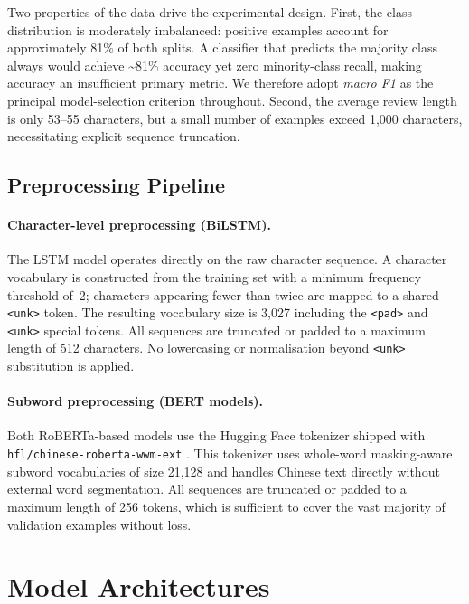 \documentclass{article}
\begin{document}
Two properties of the data drive the experimental design.  First, the class
distribution is moderately imbalanced: positive examples account for
approximately 81\% of both splits.  A classifier that predicts the majority
class always would achieve \textasciitilde81\% accuracy yet zero minority-class
recall, making accuracy an insufficient primary metric.  We therefore adopt
\emph{macro F1} as the principal model-selection criterion throughout.  Second,
the average review length is only 53--55 characters, but a small number of
examples exceed 1{,}000 characters, necessitating explicit sequence truncation.

\subsection{Preprocessing Pipeline}

\paragraph{Character-level preprocessing (BiLSTM).}
The LSTM model operates directly on the raw character sequence.  A character
vocabulary is constructed from the training set with a minimum frequency
threshold of~2; characters appearing fewer than twice are mapped to a shared
\texttt{<unk>} token.  The resulting vocabulary size is 3{,}027 including the
\texttt{<pad>} and \texttt{<unk>} special tokens.  All sequences are truncated
or padded to a maximum length of 512 characters.  No lowercasing or
normalisation beyond \texttt{<unk>} substitution is applied.

\paragraph{Subword preprocessing (BERT models).}
Both RoBERTa-based models use the Hugging Face tokenizer shipped with
\texttt{hfl/chinese-roberta-wwm-ext} \citep{cui2020revisiting}.  This
tokenizer uses whole-word masking-aware subword vocabularies of size 21{,}128
and handles Chinese text directly without external word segmentation.  All
sequences are truncated or padded to a maximum length of 256 tokens, which is
sufficient to cover the vast majority of validation examples without loss.

\section{Model Architectures}
\end{document}
